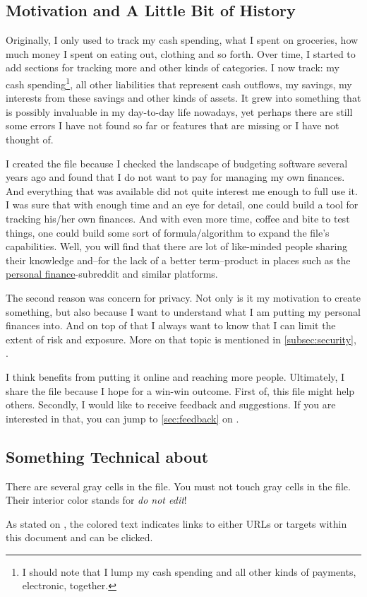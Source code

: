 \subsection{Motivation and A Little Bit of History}
\label{subsec:motivation-history}

Originally, I only used \tfn to track my cash spending, \ie what I spent on groceries, how much money I spent on eating out, clothing and so forth.
Over time, I started to add sections for tracking more and other kinds of categories.
I now track: my cash spending\footnote{I should note that I lump my cash spending and all other kinds of payments, \eg electronic, together.}, all other liabilities that represent cash outflows, my savings, my interests from these savings and other kinds of assets.
It grew into something that is possibly invaluable in my day-to-day life nowadays, yet perhaps there are still some errors I have not found so far or features that are missing or I have not thought of.

I created the file because I checked the landscape of budgeting software several years ago and found that I do not want to pay for managing my own finances.
And everything that was available did not quite interest me enough to full use it.
I was sure that with enough time and an eye for detail, one could build a tool for tracking his/her own finances.
And with even more time, coffee and bite to test things, one could build some sort of formula/algorithm to expand the file's capabilities.
Well, you will find that there are lot of like-minded people sharing their knowledge and--for the lack of a better term--product in places such as the \href{https://reddit.com/r/personalfinance}{personal finance}-subreddit and similar platforms.

The second reason was concern for privacy.
Not only is it my motivation to create something, but also because I want to understand what I am putting my personal finances into.
And on top of that I always want to know that I can limit the extent of risk and exposure.
More on that topic is mentioned in \autoref{subsec:security}, .

I think \tfn benefits from putting it online and reaching more people.
Ultimately, I share the file because I hope for a win-win outcome.
First of, this file might help others.
Secondly, I would like to receive feedback and suggestions.
If you are interested in that, you can jump to \autoref{sec:feedback} on .

\subsection{Something Technical about \tfn}
\label{subsec:introduction-something-technical}

There are several gray cells in the file.
You must not touch gray cells in the file.
Their interior color stands for \emph{do not edit}!

As stated on , the colored text indicates links to either URLs or targets within this document and can be clicked.
